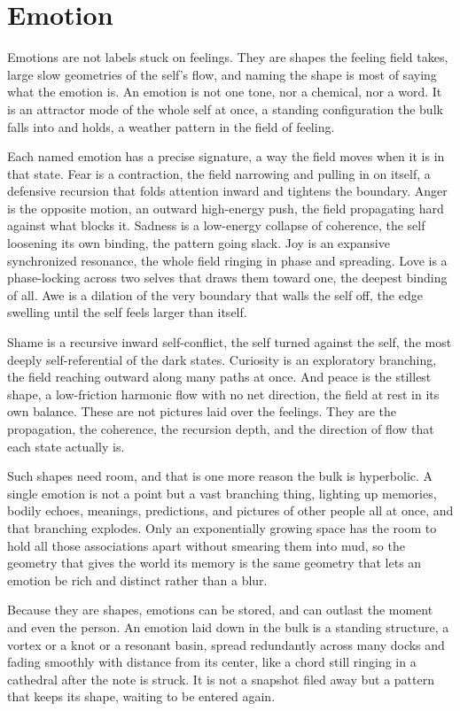 \section{Emotion}

Emotions are not labels stuck on feelings. They are shapes the feeling field takes, large slow geometries of the self's flow, and naming the shape is most of saying what the emotion is. An emotion is not one tone, nor a chemical, nor a word. It is an attractor mode of the whole self at once, a standing configuration the bulk falls into and holds, a weather pattern in the field of feeling.

Each named emotion has a precise signature, a way the field moves when it is in that state. Fear is a contraction, the field narrowing and pulling in on itself, a defensive recursion that folds attention inward and tightens the boundary. Anger is the opposite motion, an outward high-energy push, the field propagating hard against what blocks it. Sadness is a low-energy collapse of coherence, the self loosening its own binding, the pattern going slack. Joy is an expansive synchronized resonance, the whole field ringing in phase and spreading. Love is a phase-locking across two selves that draws them toward one, the deepest binding of all. Awe is a dilation of the very boundary that walls the self off, the edge swelling until the self feels larger than itself.

Shame is a recursive inward self-conflict, the self turned against the self, the most deeply self-referential of the dark states. Curiosity is an exploratory branching, the field reaching outward along many paths at once. And peace is the stillest shape, a low-friction harmonic flow with no net direction, the field at rest in its own balance. These are not pictures laid over the feelings. They are the propagation, the coherence, the recursion depth, and the direction of flow that each state actually is.

Such shapes need room, and that is one more reason the bulk is hyperbolic. A single emotion is not a point but a vast branching thing, lighting up memories, bodily echoes, meanings, predictions, and pictures of other people all at once, and that branching explodes. Only an exponentially growing space has the room to hold all those associations apart without smearing them into mud, so the geometry that gives the world its memory is the same geometry that lets an emotion be rich and distinct rather than a blur.

Because they are shapes, emotions can be stored, and can outlast the moment and even the person. An emotion laid down in the bulk is a standing structure, a vortex or a knot or a resonant basin, spread redundantly across many docks and fading smoothly with distance from its center, like a chord still ringing in a cathedral after the note is struck. It is not a snapshot filed away but a pattern that keeps its shape, waiting to be entered again.

